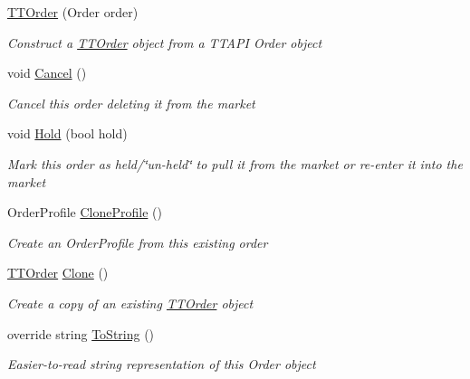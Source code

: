 \begin{DoxyCompactItemize}
\item 
\hyperlink{class_e_z_a_p_i_1_1_containers_1_1_t_t_order_a9efd11307baf3502cd1509533ed8aae0}{T\-T\-Order} (Order order)
\begin{DoxyCompactList}\small\item\em Construct a \hyperlink{class_e_z_a_p_i_1_1_containers_1_1_t_t_order}{T\-T\-Order} object from a T\-T\-A\-P\-I Order object \end{DoxyCompactList}\item 
void \hyperlink{class_e_z_a_p_i_1_1_containers_1_1_t_t_order_a60909a4ed460ac7b15836f27cf989d3a}{Cancel} ()
\begin{DoxyCompactList}\small\item\em Cancel this order deleting it from the market \end{DoxyCompactList}\item 
void \hyperlink{class_e_z_a_p_i_1_1_containers_1_1_t_t_order_a34ac5ada52216d5e70d1241b671379c0}{Hold} (bool hold)
\begin{DoxyCompactList}\small\item\em Mark this order as held/\char`\"{}un-\/held\char`\"{} to pull it from the market or re-\/enter it into the market \end{DoxyCompactList}\item 
Order\-Profile \hyperlink{class_e_z_a_p_i_1_1_containers_1_1_t_t_order_a21e061955f0c3bf386142fe1f82c9d1f}{Clone\-Profile} ()
\begin{DoxyCompactList}\small\item\em Create an Order\-Profile from this existing order \end{DoxyCompactList}\item 
\hyperlink{class_e_z_a_p_i_1_1_containers_1_1_t_t_order}{T\-T\-Order} \hyperlink{class_e_z_a_p_i_1_1_containers_1_1_t_t_order_a25bad9befaa9a69750c439736dd743d7}{Clone} ()
\begin{DoxyCompactList}\small\item\em Create a copy of an existing \hyperlink{class_e_z_a_p_i_1_1_containers_1_1_t_t_order}{T\-T\-Order} object \end{DoxyCompactList}\item 
override string \hyperlink{class_e_z_a_p_i_1_1_containers_1_1_t_t_order_ae6a72bf371cf0e75a0d6195b633de5a5}{To\-String} ()
\begin{DoxyCompactList}\small\item\em Easier-\/to-\/read string representation of this Order object \end{DoxyCompactList}\end{DoxyCompactItemize}
